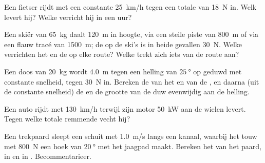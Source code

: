 \begin{exercise}[$\star\star$]\label{exo:g11:work-of-force:7}
Een fietser rijdt met een constante \qty{25}{km/h} tegen een totale
 van \qty{18}{N} in. Welk  levert hij? Welke 
verricht hij in een uur?
\end{exercise}

\begin{exercise}[$\star\star$]\label{exo:g11:work-of-force:8}
Een skiër van \qty{65}{kg} daalt \qty{120}{m} in hoogte, via een steile
piste van \qty{800}{m} of via een flauw tracé van \qty{1500}{m}; de
 op de ski's is in beide gevallen \qty{30}{N}. Welke 
verrichten het  en de  op elke route? Welke  trekt
zich iets van de route aan?
\end{exercise}

\begin{exercise}[$\star\star$]\label{exo:g11:work-of-force:9}
Een doos van \qty{20}{kg} wordt \qty{4.0}{m} tegen een helling van
$\qty{25}{\degree}$ op geduwd met constante snelheid, tegen \qty{30}{N}
 in. Bereken de  van het  en van de , en
daarna (uit de constante snelheid) de  en de grootte van de duw
evenwijdig aan de helling.
\end{exercise}

\begin{exercise}[$\star\star$]\label{exo:g11:work-of-force:10}
Een auto rijdt met \qty{130}{km/h} terwijl zijn motor \qty{50}{kW} aan de
wielen levert. Tegen welke totale remmende  vecht hij?
\end{exercise}

\begin{exercise}[$\star\star$]\label{exo:g11:work-of-force:11}
Een trekpaard sleept een schuit met \qty{1.0}{m/s} langs een kanaal,
waarbij het touw met  \qty{800}{N} een hoek van
$\qty{20}{\degree}$ met het jaagpad maakt. Bereken het  van het
paard, in  en in . Becommentarieer.
\end{exercise}

